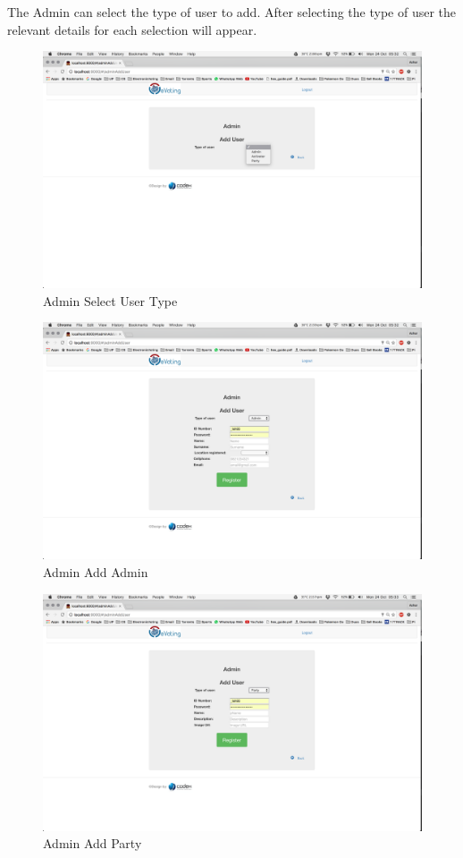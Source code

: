 \documentclass[11pt]{article}
\begin{document}
				The Admin can select the type of user to add. 
				After selecting the type of user the relevant details for each selection will appear. 
				\begin{figure}[H]
					\centering
					\includegraphics[width=0.7\linewidth]{../Images/UserManual/adminWeb/adminselectuser.png}
					\caption{Admin Select User Type}
				\end{figure}
				\begin{figure}[H]
					\centering
					\includegraphics[width=0.7\linewidth]{../Images/UserManual/adminWeb/adminadmin.png}
					\caption{Admin Add Admin}
				\end{figure}
				\begin{figure}[H]
				\centering
				\includegraphics[width=0.7\linewidth]{../Images/UserManual/adminWeb/adminparty.png}
				\caption{Admin Add Party}
				\end{figure}
\end{document}

